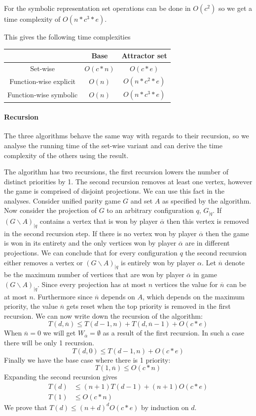 For the symbolic representation set operations can be done in $O(c^2)$ so we get a time complexity of $O(n*c^3*e)$.

This gives the following time complexities\\
\begin{center}
	\begin{tabular}{|c|c|c|}
		\hline 
		& Base & Attractor set \\ 
		\hline 
		Set-wise & $O(c*n)$ & $O(c*e)$  \\ 
		\hline 
		Function-wise explicit & $O(n)$ &  $O(n*c^2*e)$ \\ 
		\hline 
		Function-wise symbolic & $O(n)$ &  $O(n* c^3*e)$ \\ 
		\hline 
	\end{tabular} 
\end{center}

\paragraph{Recursion} The three algorithms behave the same way with regards to their recursion, so we analyse the running time of the set-wise variant and can derive the time complexity of the others using the result.

The algorithm has two recursions, the first recursion lowers the number of distinct priorities by 1. The second recursion removes at least one vertex, however the game is comprised of disjoint projections. We can use this fact in the analyses. Consider unified parity game $G$ and set $A$ as specified by the algorithm. Now consider the projection of $G$ to an arbitrary configuration $q$, $G_{|q}$. If $(G\backslash A)_{|q}$ contains a vertex that is won by player $\overline{\alpha}$ then this vertex is removed in the second recursion step. If there is no vertex won by player $\overline{\alpha}$ then the game is won in its entirety and the only vertices won by player $\overline{\alpha}$ are in different projections. We can conclude that for every configuration $q$ the second recursion either removes a vertex or $(G\backslash A)_{|q}$ is entirely won by player $\alpha$. Let $\overline{n}$ denote be the maximum number of vertices that are won by player $\overline{\alpha}$ in game $(G\backslash A)_{|q}$. Since every projection has at most $n$ vertices the value for $\overline{n}$ can be at most $n$. Furthermore since $\overline{n}$ depends on $A$, which depends on the maximum priority, the value $\overline{n}$ gets reset when the top priority is removed in the first recursion. We can now write down the recursion of the algorithm:
\[ T(d,\overline{n}) \leq T(d-1,n) + T(d, \overline{n} - 1) + O(c*e) \]
When $\overline{n} = 0$ we will get $W_{\overline{\alpha}} = \emptyset$ as a result of the first recursion. In such a case there will be only 1 recursion.
\[ T(d,0) \leq T(d-1,n) + O(c*e) \]
Finally we have the base case where there is 1 priority:
\[ T(1, \overline{n}) \leq O(c*n) \]
Expanding the second recursion gives
\begin{align*}
T(d) &\leq (n+1)T(d-1) + (n+1)O(c*e)\\
T(1) &\leq O(c*n)
\end{align*}
We prove that $T(d) \leq (n+d)^dO(c*e)$ by induction on $d$.

